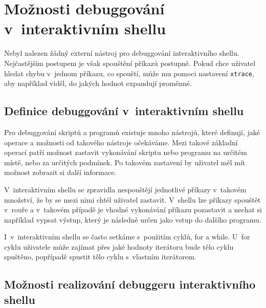 \documentclass[thesis=M,czech]{FITthesis}[2012/06/26]
\begin{document}




%
%
%
%
%
\section{Možnosti debuggování v~interaktivním shellu}

Nebyl nalezen žádný externí nástroj pro debuggování interaktivního shellu. Nejčastějším postupem je však spouštění příkazů postupně. Pokud chce uživatel hledat chybu v~jednom příkazu, co spouští, může mu pomoci nastavení \texttt{xtrace}, aby například viděl, do jakých hodnot expandují proměnné.



%
%
\subsection{Definice debuggování v~interaktivním shellu}


Pro debuggování skriptů a programů existuje mnoho nástrojů, které definují, jaké operace a možnosti od takového nástroje očekáváme. Mezi takové základní operací patří možnost zastavit vykonávání skriptu nebo programu na určitém místě, nebo za určitých podmínek. Po takovém zastavení by uživatel měl mít možnost zobrazit si další informace.

V~interaktivním shellu se zpravidla nespouštějí jednotlivé příkazy v~takovém množství, že by se mezi nimi chtěl uživatel zastavit. V~shellu lze příkazy spouštět v~rouře a v~takovém případě je vhodné vykonávání příkazu pozastavit a nechat si například vypsat výstup, který je následně určen jako vstup do dalšího programu.

I~v~interaktivním shellu se často setkáme s~použitím cyklů, for a while. U~for cyklu uživatele může zajímat přes jaké hodnoty iterátoru bude tělo cyklu spuštěno, popřípadě spustit tělo cyklu s~vlastním iterátorem.




\subsection{Možnosti realizování debuggeru interaktivního shellu}
\end{document}
